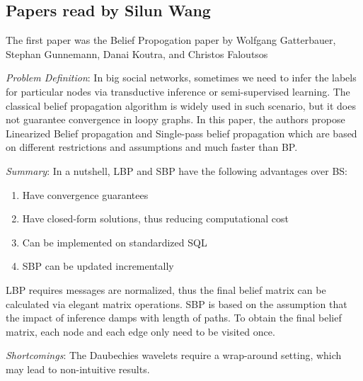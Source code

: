 \subsection{Papers read by Silun Wang}
The first paper was the Belief Propogation paper by Wolfgang Gatterbauer, Stephan Gunnemann, Danai Koutra, and Christos Faloutsos
\cite{BeliefPro}
\begin{itemize*}
\item {\em Problem Definition}: In big social networks, sometimes we need to infer the labels for particular nodes via transductive inference or semi-supervised learning. The classical belief propagation algorithm is widely used in such scenario, but it does not guarantee convergence in loopy graphs. In this paper, the authors propose Linearized Belief propagation and Single-pass belief propagation which are based on different restrictions and assumptions and much faster than BP.
\item {\em Summary}:
    In a nutshell, LBP and SBP have the following advantages over BS:
    \begin{enumerate}
	\item Have convergence guarantees
	\item Have closed-form solutions, thus reducing computational cost
	\item Can be implemented on standardized SQL
	\item SBP can be updated incrementally
	\end{enumerate}
	LBP requires messages are normalized, thus the final belief matrix can be calculated via elegant matrix operations. SBP is based on the assumption that the impact of inference damps with length of paths. To obtain the final belief matrix, each node and each edge only need to be visited once.
\item {\em Shortcomings}:
      The Daubechies wavelets require a wrap-around setting,
      which may lead to non-intuitive results.
\end{itemize*}

